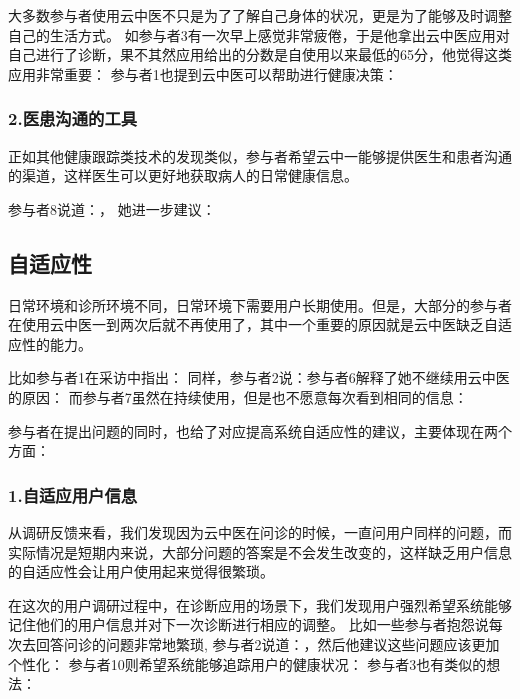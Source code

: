大多数参与者使用云中医不只是为了了解自己身体的状况，更是为了能够及时调整自己的生活方式。
如参与者3有一次早上感觉非常疲倦，于是他拿出云中医应用对自己进行了诊断，果不其然应用给出的分数是自使用以来最低的65分，他觉得这类应用非常重要：
参与者1也提到云中医可以帮助进行健康决策：


\subsubsection{2.医患沟通的工具}

正如其他健康跟踪类技术的发现类似，参与者希望云中一能够提供医生和患者沟通的渠道，这样医生可以更好地获取病人的日常健康信息。

参与者8说道：， 她进一步建议：

\subsection{自适应性}
日常环境和诊所环境不同，日常环境下需要用户长期使用。但是，大部分的参与者在使用云中医一到两次后就不再使用了，其中一个重要的原因就是云中医缺乏自适应性的能力。

比如参与者1在采访中指出：
同样，参与者2说：参与者6解释了她不继续用云中医的原因：
而参与者7虽然在持续使用，但是也不愿意每次看到相同的信息：

参与者在提出问题的同时，也给了对应提高系统自适应性的建议，主要体现在两个方面：

\subsubsection{1.自适应用户信息}

从调研反馈来看，我们发现因为云中医在问诊的时候，一直问用户同样的问题，而实际情况是短期内来说，大部分问题的答案是不会发生改变的，这样缺乏用户信息的自适应性会让用户使用起来觉得很繁琐。

在这次的用户调研过程中，在诊断应用的场景下，我们发现用户强烈希望系统能够记住他们的用户信息并对下一次诊断进行相应的调整。
比如一些参与者抱怨说每次去回答问诊的问题非常地繁琐, 参与者2说道：，然后他建议这些问题应该更加个性化：
参与者10则希望系统能够追踪用户的健康状况：
参与者3也有类似的想法：

